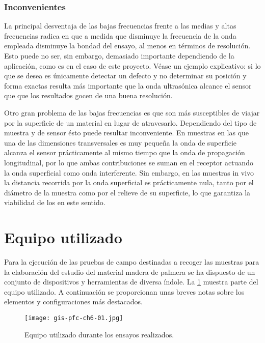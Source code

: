 \subsubsection{Inconvenientes}

La principal desventaja de las bajas frecuencias frente a las medias y
altas frecuencias radica en que a medida que disminuye la frecuencia de la
onda empleada disminuye la bondad del ensayo, al menos en términos de
resolución. Esto puede no ser, sin embargo, demasiado importante
dependiendo de la aplicación, como es en el caso de este proyecto. Véase un
ejemplo explicativo: si lo que se desea es únicamente detectar un defecto y
no determinar su posición y forma exactas resulta más importante que la
onda ultrasónica alcance el sensor que que los resultados gocen de una
buena resolución.

Otro gran problema de las bajas frecuencias es que son más susceptibles de
viajar por la superficie de un material en lugar de atravesarlo.
Dependiendo del tipo de muestra y de sensor ésto puede resultar
inconveniente. En muestras en las que una de las dimensiones transversales
es muy pequeña la onda de superficie alcanza el sensor prácticamente al
mismo tiempo que la onda de propagación longitudinal, por lo que ambas
contribuciones se suman en el receptor actuando la onda superficial como
onda interferente. Sin embargo, en las muestras in vivo la distancia
recorrida por la onda superficial es prácticamente nula, tanto por el
diámetro de la muestra como por el relieve de su superficie, lo que
garantiza la viabilidad de los  en este sentido.


\section{Equipo utilizado}

Para la ejecución de las pruebas de campo destinadas a recoger las muestras
para la elaboración del estudio del material madera de palmera se ha
dispuesto de un conjunto de dispositivos y herramientas de diversa índole.
La \cref{fig:equipment} muestra parte del equipo utilizado. A continuación
se proporcionan unas breves notas sobre los elementos y configuraciones más
destacados.

\begin{figure}
    \begin{center}
	\texttt{[image: gis-pfc-ch6-01.jpg]}
    \end{center}
    \caption[Equipo utilizado durante los ensayos]{Equipo utilizado durante
    los ensayos realizados.}
    \label{fig:equipment}
\end{figure}


